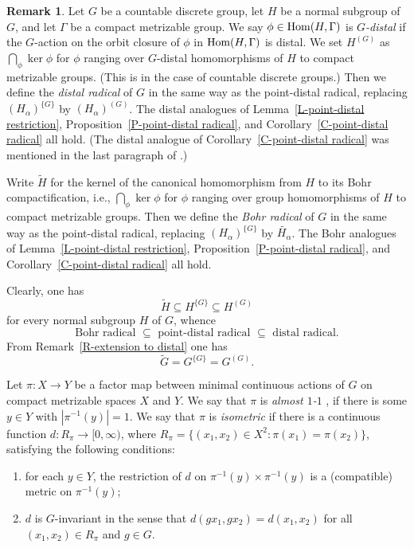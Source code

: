 \documentclass[11pt]{amsart}
\theoremstyle{definition}
\newtheorem{remark}[theorem]{Remark}
\numberwithin{equation}{section}
\theoremstyle{definition}
\newcommand{\Hom}{{\rm Hom}}
\begin{document}
\begin{remark} \label{R-distal radical and Bohr radical}
Let $G$ be a countable discrete group, let $H$ be a normal subgroup of $G$, and let $\Gamma$ be a compact metrizable group. We say $\phi\in \Hom(H, \Gamma)$ is {\it $G$-distal} if the $G$-action on the orbit closure of $\phi$ in $\Hom(H, \Gamma)$ is distal. We set $H^{(G)}$ as $\bigcap_\phi \ker \phi$ for $\phi$ ranging over $G$-distal homomorphisms of $H$ to compact metrizable groups. (This is \cite[Definition 2.4]{Abels83} in the case of countable discrete groups.) Then we define the {\it distal radical} of $G$ in the same way as the point-distal radical, replacing $(H_\alpha)^{\{G\}}$ by $(H_\alpha)^{(G)}$. The distal analogues of Lemma~\ref{L-point-distal restriction}, Proposition~\ref{P-point-distal radical}, and Corollary~\ref{C-point-distal radical} all hold. (The distal analogue of Corollary~\ref{C-point-distal radical} was mentioned in the last paragraph of \cite[page 175]{Abels83}.)

Write $\widetilde{H}$ for the kernel of the canonical homomorphism from $H$ to its Bohr compactification, i.e., $\bigcap_\phi \ker \phi$ for $\phi$ ranging over group homomorphisms of $H$ to compact metrizable groups.  Then we define the {\it Bohr radical} of $G$ in the same way as the point-distal radical, replacing $(H_\alpha)^{\{G\}}$ by $\widetilde{H_\alpha}$. The Bohr analogues of Lemma~\ref{L-point-distal restriction}, Proposition~\ref{P-point-distal radical}, and Corollary~\ref{C-point-distal radical} all hold.

Clearly, one has
$$\widetilde{H}\subseteq H^{\{G\}}\subseteq H^{(G)}$$
for every normal subgroup $H$ of $G$, whence
$$ \mbox{Bohr radical } \subseteq \mbox{ point-distal radical } \subseteq \mbox{ distal radical}.$$
From Remark~\ref{R-extension to distal} one has
$$\widetilde{G}=G^{\{G\}}=G^{(G)}.$$
\end{remark}

Let $\pi: X\rightarrow Y$ be a factor map between minimal continuous actions of $G$ on compact metrizable spaces $X$ and $Y$.  We say that $\pi$ is {\it almost $1$-$1$} \cite[Remark IV.6.1.2]{deVries}, if there is some $y\in Y$ with $|\pi^{-1}(y)|=1$.  We say that $\pi$ is {\it isometric} \cite[Remark V.5.20.2 and Corollary V.5.19]{deVries} if there is a continuous function $d: R_\pi\rightarrow [0, \infty)$, where $R_\pi=\{(x_1, x_2)\in X^2: \pi(x_1)=\pi(x_2)\}$, satisfying the following conditions:
\begin{enumerate}
\item for each $y\in Y$, the restriction of $d$ on $\pi^{-1}(y)\times \pi^{-1}(y)$ is a (compatible) metric on $\pi^{-1}(y)$;
\item $d$ is $G$-invariant in the sense that $d(gx_1, gx_2)=d(x_1, x_2)$ for all $(x_1, x_2)\in R_\pi$ and $g\in G$.
\end{enumerate}
\end{document}
